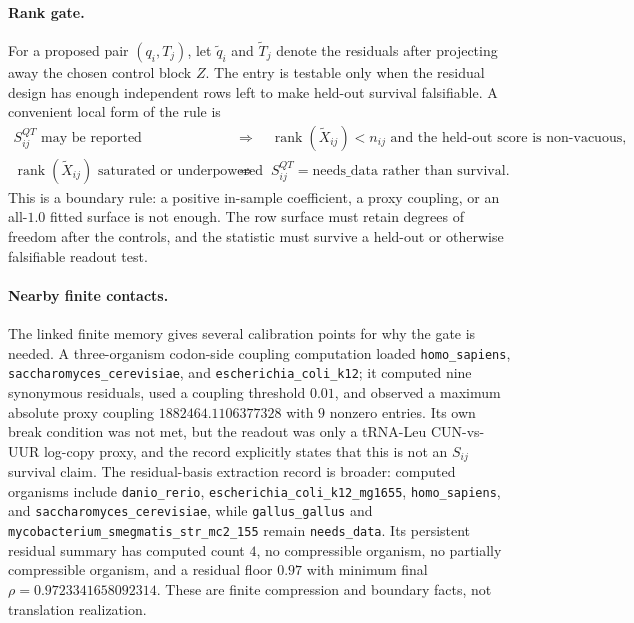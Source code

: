 \paragraph{Rank gate.}
For a proposed pair $(q_i,T_j)$, let $\widetilde q_i$ and $\widetilde T_j$ denote the residuals after projecting away the chosen control block $Z$. The entry is testable only when the residual design has enough independent rows left to make held-out survival falsifiable. A convenient local form of the rule is
$$
\begin{aligned}
S^{QT}_{ij} \text{ may be reported} \quad &\Rightarrow\quad \operatorname{rank}(\widetilde X_{ij}) < n_{ij} \text{ and the held-out score is non-vacuous},\\
\operatorname{rank}(\widetilde X_{ij}) \text{ saturated or underpowered} \quad &\Rightarrow\quad S^{QT}_{ij}=\text{needs\_data rather than survival}.
\end{aligned}
$$
This is a boundary rule: a positive in-sample coefficient, a proxy coupling, or an all-$1.0$ fitted surface is not enough. The row surface must retain degrees of freedom after the controls, and the statistic must survive a held-out or otherwise falsifiable readout test.

\paragraph{Nearby finite contacts.}
The linked finite memory gives several calibration points for why the gate is needed. A three-organism codon-side coupling computation loaded \texttt{homo\_sapiens}, \texttt{saccharomyces\_cerevisiae}, and \texttt{escherichia\_coli\_k12}; it computed nine synonymous residuals, used a coupling threshold $0.01$, and observed a maximum absolute proxy coupling $1882464.1106377328$ with $9$ nonzero entries. Its own break condition was not met, but the readout was only a tRNA-Leu CUN-vs-UUR log-copy proxy, and the record explicitly states that this is not an $S_{ij}$ survival claim. The residual-basis extraction record is broader: computed organisms include \texttt{danio\_rerio}, \texttt{escherichia\_coli\_k12\_mg1655}, \texttt{homo\_sapiens}, and \texttt{saccharomyces\_cerevisiae}, while \texttt{gallus\_gallus} and \texttt{mycobacterium\_smegmatis\_str\_mc2\_155} remain \texttt{needs\_data}. Its persistent residual summary has computed count $4$, no compressible organism, no partially compressible organism, and a residual floor $0.97$ with minimum final $\rho=0.9723341658092314$. These are finite compression and boundary facts, not translation realization.

